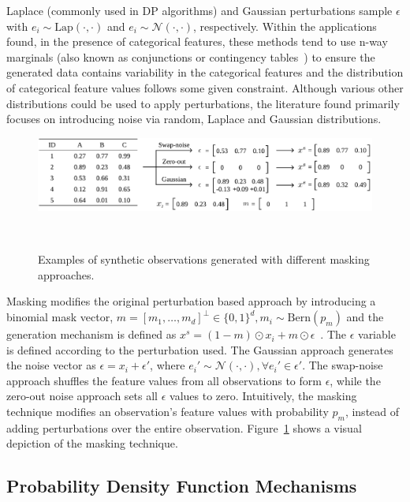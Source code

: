 \documentclass[parskip=full]{scrartcl}
\begin{document}
Laplace (commonly used in DP algorithms) and Gaussian perturbations sample
$\epsilon$ with $e_i \sim \text{Lap}(\cdot, \cdot)$ and $e_i \sim
\mathcal{N}(\cdot, \cdot)$, respectively. Within the applications found, in
the presence of categorical features, these methods tend to use n-way
marginals (also known as conjunctions or contingency
tables~\cite{gaboardi2014dual}) to ensure the generated data contains
variability in the categorical features and the distribution of categorical
feature values follows some given constraint.  Although various other
distributions could be used to apply perturbations, the literature found
primarily focuses on introducing noise via random, Laplace and Gaussian
distributions.

\begin{figure}
	\centering
	\includegraphics[width=1\linewidth]{../analysis/masking-example}
    \caption{Examples of synthetic observations generated with different
        masking approaches.
    }~\label{fig:masking-example}
\end{figure}

Masking modifies the original perturbation based approach by introducing a
binomial mask vector, $m = [m_1, \ldots, m_d]^\bot \in \{0,1\}^d, m_i \sim
\text{Bern}(p_m)$ and the generation mechanism is defined as $x^s = (1 -
m)\odot x_i + m \odot \epsilon$~\cite{yoon2020vime}. The $\epsilon$ variable
is defined according to the perturbation used. The Gaussian approach generates
the noise vector as $\epsilon = x_i + \epsilon'$, where $e_i' \sim
\mathcal{N}(\cdot, \cdot), \forall e_i' \in \epsilon'$. The swap-noise
approach shuffles the feature values from all observations to form
$\epsilon$, while the zero-out noise approach sets all $\epsilon$ values to
zero. Intuitively, the masking technique modifies an observation's feature
values with probability $p_m$, instead of adding perturbations over the
entire observation. Figure~\ref{fig:masking-example} shows a visual depiction
of the masking technique.

\subsection{Probability Density Function Mechanisms}
\end{document}
